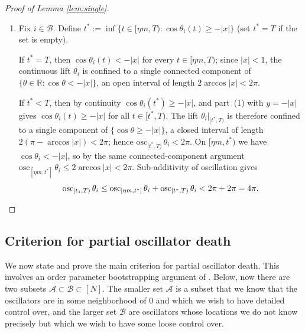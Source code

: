 \documentclass[11pt,reqno]{amsart}
\newcommand{\R}{\mathbb{R}}
\theoremstyle{definition}
\theoremstyle{remark}
\begin{document}
\begin{proof}[Proof of Lemma \ref{lem:single}]
\begin{enumerate}
If there were another time $t_2\in [t_0+\varepsilon,T)$ for which $\cos\theta_i(t_2)\le y$, then by making $t_2$ the earliest such time, we must have $\cos\theta_i(t_2)=y$, and the same computation as above shows that $\frac{d}{dt}\cos\theta_i(t_2)>0$, giving a contradiction (as there would be times slightly smaller than $t_2$ at which $\cos\theta_i<y$, violating the minimality of $t_2$).

By this exit-time argument, we have $\cos\theta_i(t)\ge y$ for all $t\in[t_0,T)$ (and in fact, the stronger statement that $\cos\theta_i(t)>y$ for $t\in (t_0,T)$).

The latter statement follows from $y>-1$, and the continuity of $\theta_i$ in $t$. More explicitly, $\theta_i|_{[t_1,T)}$ is confined to a single component of $\{\cos\theta\ge -|x|\}$, a closed
interval of length $2(\pi-\arccos|x|)<2\pi$; hence
$\mathrm{osc}_{[t_1,T)}\,\theta_i<2\pi$. 
\item Fix $i\in\mathcal{B}$. Define
$t^{*}:=\inf\{t\in[\eta m,T):\cos\theta_i(t)\ge -|x|\}$
(set $t^{*}=T$ if the set is empty).

If $t^{*}=T$, then $\cos\theta_i(t)<-|x|$ for every $t\in[\eta m,T)$;
since $|x|<1$, the continuous lift $\theta_i$ is confined to a single
connected component of $\{\theta\in\R:\cos\theta<-|x|\}$, an open
interval of length $2\arccos|x|<2\pi$.

If $t^{*}<T$, then by continuity $\cos\theta_i(t^{*})\ge -|x|$, and
part~(1) with $y=-|x|$ gives $\cos\theta_i(t)\ge -|x|$ for all
$t\in[t^{*},T)$. The lift $\theta_i|_{[t^{*},T)}$ is therefore
confined to a single component of $\{\cos\theta\ge -|x|\}$, a closed
interval of length $2(\pi-\arccos|x|)<2\pi$; hence
$\mathrm{osc}_{[t^{*},T)}\,\theta_i<2\pi$. On $[\eta m,t^{*})$ we
have $\cos\theta_i<-|x|$, so by the same connected-component argument
$\mathrm{osc}_{[\eta m,t^{*}]}\,\theta_i\le 2\arccos|x|<2\pi$.
Sub-additivity of oscillation gives
\[
\mathrm{osc}_{[t_1,T)}\,\theta_i\le \mathrm{osc}_{[\eta m,t^{*}]}\,\theta_i+\mathrm{osc}_{[t^{*},T)}\,\theta_i
<2\pi+2\pi=4\pi.\qedhere
\]

\end{enumerate}
\end{proof}

\subsection{Criterion for partial oscillator death}

We now state and prove the main criterion for partial oscillator death. This involves an order parameter bootstrapping argument of \cite{ryoo2026oscillator}. Below, now there are two subsets $\mathcal{A}\subset \mathcal{B}\subset [N]$. The smaller set $\mathcal{A}$ is a subset that we know that the oscillators are in some neighborhood of $0$ and which we wish to have detailed control over, and the larger set $\mathcal{B}$ are oscillators whose locations we do not know precisely but which we wish to have some loose control over.
\end{document}
